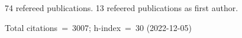 74 refereed publications. 13 refeered publications as first author.

Total citations~=~3007; h-index~=~30 (2022-12-05)